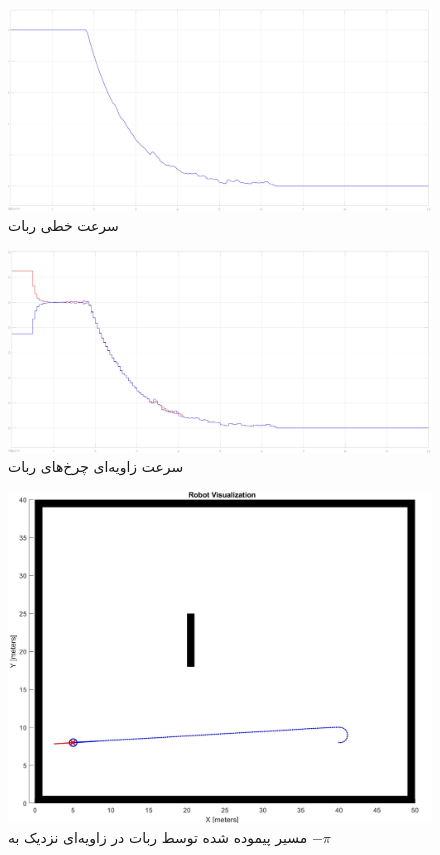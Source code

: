  \begin{figure}[!h] 
 	\centering
 	\includegraphics[scale=0.12]{Images/1-robot speed.jpg}
 	\caption{سرعت خطی ربات} \label{Fig 1-robot-speed}
 \end{figure}
 
 \begin{figure}[!h] 
 	\centering
 	\includegraphics[scale=0.12]{Images/1-robot motors.jpg}
 	\caption{سرعت زاویه‌ای چرخ‌های ربات} \label{Fig 1-robot-motors}
 \end{figure}
 
 \begin{figure}[!h] 
 	\centering
 	\includegraphics[scale=0.3]{Images/1-robot theta.jpg}
 	\caption{مسیر پیموده شده توسط ربات در زاو‌یه‌ای نزدیک به $-\pi$} \label{Fig 1-robot-theta}
 \end{figure}
 
 
 
 
 
 
 
 
 
 